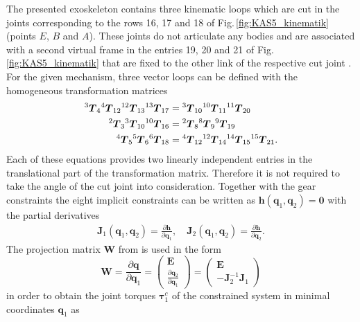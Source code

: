 \documentclass{svproc}
\newcommand{\bm}[1]{\boldsymbol{#1}}
\renewcommand{\vec}[1]{\mbox{\boldmath{$#1$}}}
\newcommand{\tmat}[2]{{^{\mathrm{#1}}\vec{T}_{\mathrm{#2}}}}
\begin{document}
The presented exoskeleton contains three kinematic loops which are cut in the joints corresponding to the rows 16, 17 and 18 of Fig.\,\ref{fig:KAS5_kinematik} (points $E$, $B$ and $A$).
These joints do not articulate any bodies and are associated with a second virtual frame in the entries 19, 20 and 21 of Fig.\,\ref{fig:KAS5_kinematik} that are fixed to the other link of the respective cut joint \cite{KhalilBen1995,SaminFis2013}.
For the given mechanism, three vector loops can be defined with the homogeneous transformation matrices
%
\begin{align}
\tmat{3}{4} \tmat{4}{12} \tmat{12}{13} \tmat{13}{17} &= \tmat{3}{10} \tmat{10}{11} \tmat{11}{20} \label{equ:implconstr_chain1} \\
\tmat{2}{3} \tmat{3}{10} \tmat{10}{16}  &= \tmat{2}{8} \tmat{8}{9} \tmat{9}{19} \label{equ:implconstr_chain2} \\
\tmat{4}{5} \tmat{5}{6} \tmat{6}{18}  &= \tmat{4}{12} \tmat{12}{14} \tmat{14}{15} \tmat{15}{21}.
\label{equ:implconstr_chain3}
\end{align}
%
Each of these equations provides two linearly independent entries in the translational part of the transformation matrix.
Therefore it is not required to take the angle of the cut joint into consideration.
Together with the gear constraints the eight implicit constraints can be written as
%
$
\bm{h}(\bm{q}_1, \bm{q}_2) = \bm{0}
$
%
with the partial derivatives
%
\vspace{-0.3cm}
\begin{align}
\bm{J}_1(\bm{q}_1, \bm{q}_2)=\frac{\partial\bm{h}}{\partial \bm{q}_1}, \quad 
\bm{J}_2(\bm{q}_1, \bm{q}_2)=\frac{\partial\bm{h}}{\partial \bm{q}_2}. \label{equ:kinconstr_impl_grad}
\end{align}
%
The projection matrix $\bm{W}$ from \cite{NakamuraGho1989,ParkChoPlo1999} is used in the form
\vspace{-0.3cm}
%
\begin{equation}
\bm{W} = \frac{\partial \bm{q}}{\partial \bm{q}_1} 
= \begin{pmatrix} \bm{E}\\ \frac{\partial \bm{q}_2}{\partial \bm{q}_1} \end{pmatrix}
= \begin{pmatrix} \bm{E}\\ -\bm{J}_2^{-1}\bm{J}_1 \end{pmatrix}
\label{equ:kinconstr_impl_projmatrix}
\end{equation}
%
in order to obtain the joint torques $\bm{\tau}^c_1$ of the constrained system in minimal coordinates $\bm{q}_1$ as
\end{document}
